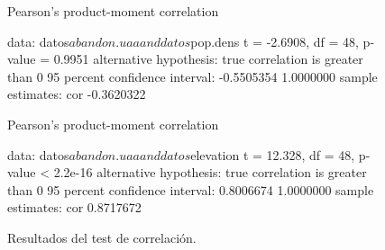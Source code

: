 \documentclass[11pt,a4paper]{article}
\begin{document}
\begin{figure}
\centering
\begin{boxedverbatim}
    Pearson's product-moment correlation

data:  datos$abandon.uaa and datos$pop.dens
t = -2.6908, df = 48, p-value = 0.9951
alternative hypothesis: true correlation is greater than 0
95 percent confidence interval:
 -0.5505354  1.0000000
sample estimates:
       cor 
-0.3620322
\end{boxedverbatim}

\begin{boxedverbatim}
    Pearson's product-moment correlation

data:  datos$abandon.uaa and datos$elevation
t = 12.328, df = 48, p-value < 2.2e-16
alternative hypothesis: true correlation is greater than 0
95 percent confidence interval:
 0.8006674 1.0000000
sample estimates:
       cor 
0.8717672 
\end{boxedverbatim}
\caption{Resultados del test de correlación.}
\label{fig:res.corr}
\end{figure}
\end{document}
